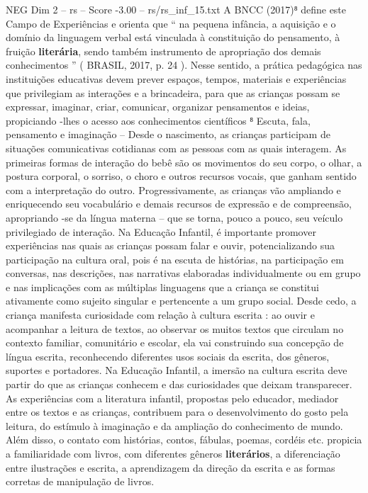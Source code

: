 \begin{textsample}{NEG Dim 2 – rs – Score -3.00 – rs/rs\_inf\_15.txt}
A BNCC (2017)⁸ define este Campo de Experiências e orienta que “ na pequena infância, a aquisição e o domínio da linguagem verbal está vinculada à constituição do pensamento, à fruição \textbf{literária}, sendo também instrumento de apropriação dos demais conhecimentos ” ( BRASIL, 2017, p. 24 ).
Nesse sentido, a prática pedagógica nas instituições educativas devem prever espaços, tempos, materiais e experiências que privilegiam as interações e a brincadeira, para que as crianças possam se expressar, imaginar, criar, comunicar, organizar pensamentos e ideias, propiciando -lhes o acesso aos conhecimentos científicos ⁸ Escuta, fala, pensamento e imaginação – Desde o nascimento, as crianças participam de situações comunicativas cotidianas com as pessoas com as quais interagem.
As primeiras formas de interação do bebê são os movimentos do seu corpo, o olhar, a postura corporal, o sorriso, o choro e outros recursos vocais, que ganham sentido com a interpretação do outro.
Progressivamente, as crianças vão ampliando e enriquecendo seu vocabulário e demais recursos de expressão e de compreensão, apropriando -se da língua materna – que se torna, pouco a pouco, seu veículo privilegiado de interação.
Na Educação Infantil, é importante promover experiências nas quais as crianças possam falar e ouvir, potencializando sua participação na cultura oral, pois é na escuta de histórias, na participação em conversas, nas descrições, nas narrativas elaboradas individualmente ou em grupo e nas implicações com as múltiplas linguagens que a criança se constitui ativamente como sujeito singular e pertencente a um grupo social.
Desde cedo, a criança manifesta curiosidade com relação à cultura escrita : ao ouvir e acompanhar a leitura de textos, ao observar os muitos textos que circulam no contexto familiar, comunitário e escolar, ela vai construindo sua concepção de língua escrita, reconhecendo diferentes usos sociais da escrita, dos gêneros, suportes e portadores.
Na Educação Infantil, a imersão na cultura escrita deve partir do que as crianças conhecem e das curiosidades que deixam transparecer.
As experiências com a literatura infantil, propostas pelo educador, mediador entre os textos e as crianças, contribuem para o desenvolvimento do gosto pela leitura, do estímulo à imaginação e da ampliação do conhecimento de mundo.
Além disso, o contato com histórias, contos, fábulas, poemas, cordéis etc. propicia a familiaridade com livros, com diferentes gêneros \textbf{literários}, a diferenciação entre ilustrações e escrita, a aprendizagem da direção da escrita e as formas corretas de manipulação de livros.

\end{textsample}
